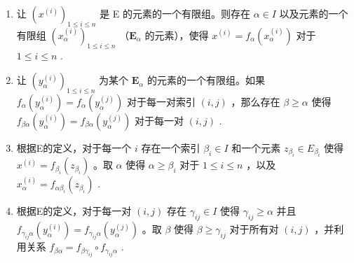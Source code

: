 \begin{enumerate}
\def\labelenumi{(\roman{enumi})}
\item
  让 \((x^{(i)})_{1\leqslant i\leqslant n}\) 是 E 的元素的一个有限组。则存在 \(\alpha \in I\) 以及元素的一个有限组 \((x_{\alpha}^{(i)})_{1\leqslant i\leqslant n}\) （\(\mathbf{E}_{\alpha}\) 的元素），使得 \(x^{(i)} = f_{\alpha}(x_{\alpha}^{(i)})\) 对于 \(1\leqslant i\leqslant n\) .
\item
  让 \((y_{\alpha}^{(i)})_{1\leqslant i\leqslant n}\) 为某个 \(\mathbf{E}_{\alpha}\) 的元素的一个有限组。如果 \(f_{\alpha}(y_{\alpha}^{(i)}) = f_{\alpha}(y_{\alpha}^{(j)})\) 对于每一对索引 \((i,j)\) ，那么存在 \(\beta \geqslant \alpha\) 使得 \(f_{\beta \alpha}(y_{\alpha}^{(i)}) = f_{\beta \alpha}(y_{\alpha}^{(j)})\) 对于每一对 \((i,j)\) .
\item
  根据E的定义，对于每一个 \(i\) 存在一个索引 \(\beta_{i} \in I\) 和一个元素 \(z_{\beta_{i}} \in E_{\beta_{i}}\) 使得 \(x^{(i)} = f_{\beta_{i}}(z_{\beta_{i}})\) 。取 \(\alpha\) 使得 \(\alpha \geqslant \beta_{i}\) 对于 \(1 \leqslant i \leqslant n\) ，以及 \(x_{\alpha}^{(i)} = f_{\alpha \beta_{i}}(z_{\beta_{i}})\) .
\item
  根据E的定义，对于每一对 \((i, j)\) 存在 \(\gamma_{ij} \in I\) 使得 \(\gamma_{ij} \geqslant \alpha\) 并且 \(f_{\gamma_{ij}\alpha}(y_{\alpha}^{(i)}) = f_{\gamma_{ij}\alpha}(y_{\alpha}^{(j)})\) 。取 \(\beta\) 使得 \(\beta \geqslant \gamma_{ij}\) 对于所有对 \((i, j)\) ，并利用关系 \(f_{\beta\alpha} = f_{\beta\gamma_{ij}} \circ f_{\gamma_{ij}\alpha}\) .
\end{enumerate}

